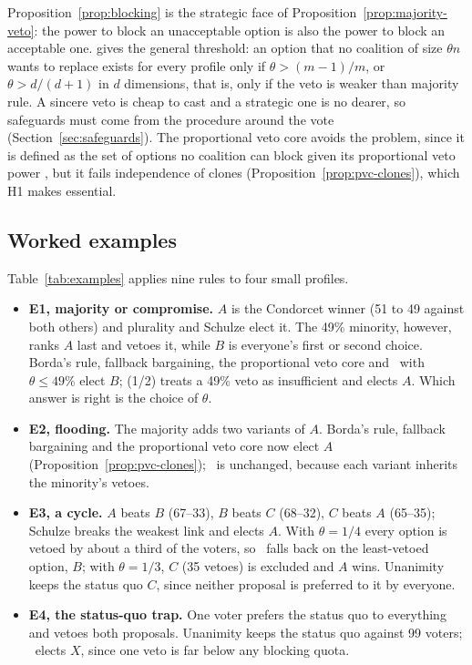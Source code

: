 Proposition~\ref{prop:blocking} is the strategic face of Proposition~\ref{prop:majority-veto}: the power to
block an unacceptable option is also the power to block an acceptable one. \citet{Greenberg1979} gives
the general threshold: an option that no coalition of size $\theta n$ wants to replace exists for every
profile only if $\theta > (m-1)/m$, or $\theta > d/(d+1)$ in $d$ dimensions, that is, only if the veto is
weaker than majority rule. A sincere veto is cheap to cast and a strategic one is no dearer, so
safeguards must come from the procedure around the vote (Section~\ref{sec:safeguards}). The proportional
veto core avoids the problem, since it is defined as the set of options no coalition can block given its
proportional veto power \citep{Moulin1981,Moulin1982}, but it fails independence of clones
(Proposition~\ref{prop:pvc-clones}), which H1 makes essential.

\subsection{Worked examples}\label{sec:examples}

Table~\ref{tab:examples} applies nine rules to four small profiles.



\begin{itemize}
  \item \textbf{E1, majority or compromise.} $A$ is the Condorcet winner (51 to 49 against both others)
  and plurality and Schulze elect it. The 49\% minority, however, ranks $A$ last and vetoes it, while $B$
  is everyone's first or second choice. Borda's rule, fallback bargaining, the proportional veto core and
  \QVC\ with $\theta \le 49\%$ elect $B$; \QVC(1/2) treats a 49\% veto as insufficient and elects $A$.
  Which answer is right is the choice of $\theta$.
  \item \textbf{E2, flooding.} The majority adds two variants of $A$. Borda's rule, fallback bargaining
  and the proportional veto core now elect $A$ (Proposition~\ref{prop:pvc-clones}); \QVC\ is unchanged,
  because each variant inherits the minority's vetoes.
  \item \textbf{E3, a cycle.} $A$ beats $B$ (67--33), $B$ beats $C$ (68--32), $C$ beats $A$ (65--35);
  Schulze breaks the weakest link and elects $A$. With $\theta = 1/4$ every option is vetoed by about a
  third of the voters, so \QVC\ falls back on the least-vetoed option, $B$; with $\theta = 1/3$, $C$ (35
  vetoes) is excluded and $A$ wins. Unanimity keeps the status quo $C$, since neither proposal is
  preferred to it by everyone.
  \item \textbf{E4, the status-quo trap.} One voter prefers the status quo to everything and vetoes both
  proposals. Unanimity keeps the status quo against 99 voters; \QVC\ elects $X$, since one veto is far
  below any blocking quota.
\end{itemize}

